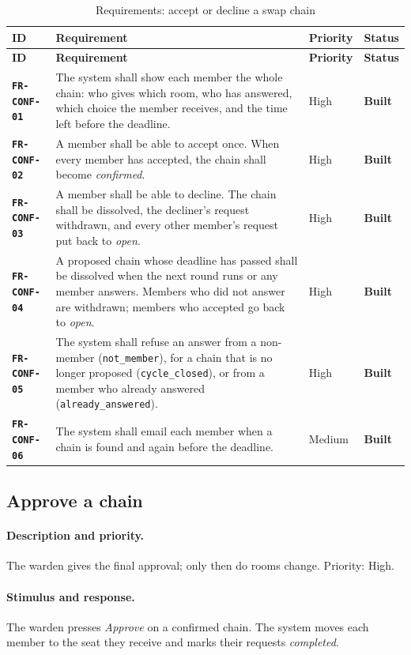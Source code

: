 \documentclass[11pt,a4paper,parskip=half,toc=listof]{scrreprt}
\newcommand{\Built}{\textcolor{builtgreen}{\textbf{Built}}}
\newcommand{\Req}[1]{\textbf{\texttt{#1}}}
\newcommand{\ReqHeader}{%
  \toprule
  \textbf{ID} & \textbf{Requirement} & \textbf{Priority} & \textbf{Status}\\
  \midrule}
\begin{document}
\begin{xltabular}{\linewidth}{@{}L{2.25cm}YL{1.55cm}L{1.6cm}@{}}
  \caption{Requirements: accept or decline a swap chain}\label{tab:fr-conf}\\
  \ReqHeader
  \endfirsthead
  \ReqHeader
  \endhead
  \bottomrule
  \endlastfoot
  \Req{FR-CONF-01} & The system shall show each member the whole chain: who
    gives which room, who has answered, which choice the member receives,
    and the time left before the deadline. & High & \Built\\
  \Req{FR-CONF-02} & A member shall be able to accept once. When every
    member has accepted, the chain shall become \emph{confirmed}. & High &
    \Built\\
  \Req{FR-CONF-03} & A member shall be able to decline. The chain shall be
    dissolved, the decliner's request withdrawn, and every other member's
    request put back to \emph{open}. & High & \Built\\
  \Req{FR-CONF-04} & A proposed chain whose deadline has passed shall be
    dissolved when the next round runs or any member answers. Members who
    did not answer are withdrawn; members who accepted go back to
    \emph{open}. & High & \Built\\
  \Req{FR-CONF-05} & The system shall refuse an answer from a non-member
    (\texttt{not\_member}), for a chain that is no longer proposed
    (\texttt{cycle\_closed}), or from a member who already answered
    (\texttt{already\_answered}). & High & \Built\\
  \Req{FR-CONF-06} & The system shall email each member when a chain is
    found and again before the deadline. & Medium & \Built\\
\end{xltabular}

\subsection{Approve a chain}

\paragraph{Description and priority.} The warden gives the final approval;
only then do rooms change. Priority: High.

\paragraph{Stimulus and response.} The warden presses \emph{Approve} on a
confirmed chain. The system moves each member to the seat they receive and
marks their requests \emph{completed}.
\end{document}
